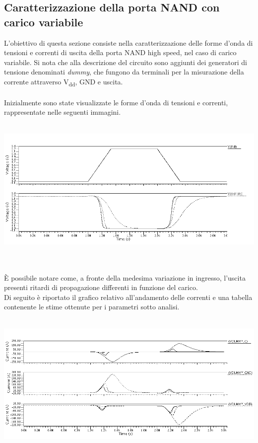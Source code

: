 \documentclass[11pt,  english, makeidx, a4paper, titlepage, oneside]{book}
\begin{document}
\subsection{Caratterizzazione della porta NAND con carico variabile}
L'obiettivo di questa sezione consiste nella caratterizzazione delle forme d'onda di tensioni e correnti di uscita della porta NAND high speed, nel caso di carico variabile. Si nota che alla descrizione del circuito sono aggiunti dei generatori di tensione denominati \textit{dummy}, che fungono da terminali per la misurazione della corrente attraverso V\textsubscript{dd}, GND e uscita.
\\\\
Inizialmente sono state visualizzate le forme d'onda di tensioni e correnti, rappresentate nelle seguenti immagini.
\\\\
\centerline{\includegraphics[width=14cm]{./img/Lab_5/waveform_2.png}}
\\\\
È possibile notare come, a fronte della medesima variazione in ingresso, l'uscita presenti ritardi di propagazione differenti in funzione del carico.
\\
Di seguito è riportato il grafico relativo all'andamento delle correnti e una tabella contenente le stime ottenute per i parametri sotto analisi.
\\\\
\centerline{\includegraphics[width=14cm]{./img/Lab_5/waveform_3.png}}
\end{document}
